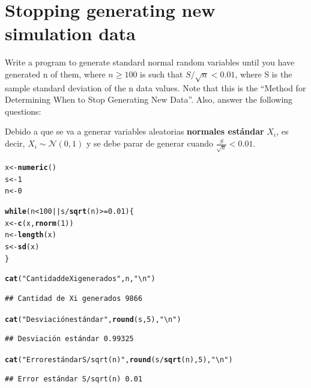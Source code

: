 \documentclass[12pt]{article}\usepackage[]{graphicx}\usepackage[]{xcolor}
\makeatletter
\newcommand{\hlnum}[1]{\textcolor[rgb]{0.686,0.059,0.569}{#1}}%
\newcommand{\hlsng}[1]{\textcolor[rgb]{0.192,0.494,0.8}{#1}}%
\newcommand{\hlopt}[1]{\textcolor[rgb]{0,0,0}{#1}}%
\newcommand{\hldef}[1]{\textcolor[rgb]{0.345,0.345,0.345}{#1}}%
\newcommand{\hlkwa}[1]{\textcolor[rgb]{0.161,0.373,0.58}{\textbf{#1}}}%
\newcommand{\hlkwb}[1]{\textcolor[rgb]{0.69,0.353,0.396}{#1}}%
\newcommand{\hlkwd}[1]{\textcolor[rgb]{0.737,0.353,0.396}{\textbf{#1}}}%
\newenvironment{kframe}{%
 \def\at@end@of@kframe{}%
 \ifinner\ifhmode%
  \def\at@end@of@kframe{\end{minipage}}%
  \begin{minipage}{\columnwidth}%
 \fi\fi%
 \def\FrameCommand##1{\hskip\@totalleftmargin \hskip-\fboxsep
 \colorbox{shadecolor}{##1}\hskip-\fboxsep
     \hskip-\linewidth \hskip-\@totalleftmargin \hskip\columnwidth}%
 \MakeFramed {\advance\hsize-\width
   \@totalleftmargin\z@ \linewidth\hsize
   \@setminipage}}%
 {\par\unskip\endMakeFramed%
 \at@end@of@kframe}
\newenvironment{knitrout}{}{} %
\makeatother
\begin{document}
\section{Stopping generating new simulation data}

Write a program to generate standard normal random variables until you have generated n of them, where $n \geq 100$ is such that $S/\sqrt{n} < 0.01$, where S is the sample standard deviation of the n data values. Note that this is the ``Method for Determining When to Stop Generating New Data''. Also, answer the following questions:



Debido a que se va a generar variables aleatorias \textbf{normales estándar} $X_{i}$, es decir, $X_{i} \sim \mathcal{N}(0, 1)$ y se debe parar de generar cuando $\frac{S}{\sqrt{n}} < 0.01$.

\begin{knitrout}
\color{fgcolor}\begin{kframe}
\begin{alltt}
\hldef{x} \hlkwb{<-} \hlkwd{numeric}\hldef{()}
\hldef{s} \hlkwb{<-} \hlnum{1}
\hldef{n} \hlkwb{<-} \hlnum{0}

\hlkwa{while}\hldef{(n} \hlopt{<} \hlnum{100} \hlopt{||} \hldef{s} \hlopt{/} \hlkwd{sqrt}\hldef{(n)} \hlopt{>=} \hlnum{0.01}\hldef{) \{}
  \hldef{x} \hlkwb{<-} \hlkwd{c}\hldef{(x,} \hlkwd{rnorm}\hldef{(}\hlnum{1}\hldef{))}
  \hldef{n} \hlkwb{<-} \hlkwd{length}\hldef{(x)}
  \hldef{s} \hlkwb{<-} \hlkwd{sd}\hldef{(x)}
\hldef{\}}

\hlkwd{cat}\hldef{(}\hlsng{"Cantidad de Xi generados"}\hldef{, n,} \hlsng{"\textbackslash{}n"}\hldef{)}
\end{alltt}
\begin{verbatim}
## Cantidad de Xi generados 9866
\end{verbatim}
\begin{alltt}
\hlkwd{cat}\hldef{(}\hlsng{"Desviación estándar"}\hldef{,} \hlkwd{round}\hldef{(s,} \hlnum{5}\hldef{),} \hlsng{"\textbackslash{}n"}\hldef{)}
\end{alltt}
\begin{verbatim}
## Desviación estándar 0.99325
\end{verbatim}
\begin{alltt}
\hlkwd{cat}\hldef{(}\hlsng{"Error estándar S/sqrt(n)"}\hldef{,} \hlkwd{round}\hldef{(s}\hlopt{/}\hlkwd{sqrt}\hldef{(n),} \hlnum{5}\hldef{),} \hlsng{"\textbackslash{}n"}\hldef{)}
\end{alltt}
\begin{verbatim}
## Error estándar S/sqrt(n) 0.01
\end{verbatim}
\end{kframe}
\end{knitrout}
\end{document}

